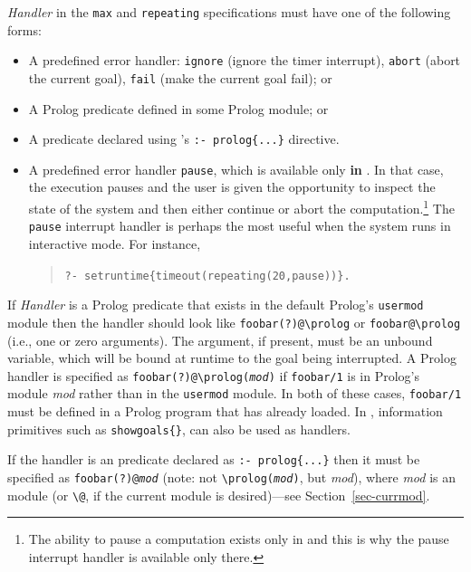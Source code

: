 \documentclass[11pt]{article}
\newcommand{\ERGO}{\mbox{\smaller{\ensuremath{\cal{E}}\smaller{{\sc{RGO}}}}}\xspace}
\newcommand{\FLSYSTEM}{\ERGO}
\newcommand{\bs}{\textbackslash}
\begin{document}
\noindent
{}
\emph{Handler} in the \texttt{max} and \texttt{repeating}
specifications must have one of the following forms:
  \begin{itemize}
  \item A predefined error handler: \texttt{ignore} (ignore the timer
    interrupt), \texttt{abort} (abort the current goal), \texttt{fail}
    (make the current goal fail); or
  \item A Prolog predicate defined in some Prolog module; or
  \item A predicate declared using \FLSYSTEM's \texttt{:- prolog\{...\}} directive.
  \item A predefined error handler \texttt{pause}, which is available only
    \textbf{in} \ERGO. In that case, the execution pauses and the user is
    given the
    opportunity to inspect the state of the system and then either continue
    or abort the computation.\footnote{The ability to pause a computation exists
    only in \ERGO and this is why the pause interrupt handler is available
    only there.}
  The \texttt{pause} interrupt handler is perhaps the most useful when the
  system runs in interactive mode. 
  For instance,
  \begin{quote}
    \texttt{?- setruntime\{timeout(repeating(20,pause))\}.}     
  \end{quote}
  \end{itemize}

  If \emph{Handler} is a Prolog predicate that exists in the default
  Prolog's \texttt{usermod} module then the handler should look like
  \texttt{foobar(?)@\bs{}prolog} or \texttt{foobar@\bs{}prolog} (i.e., one or zero arguments).
  The argument, if present, must be an unbound variable, which will
  be bound at runtime to the goal being interrupted.
  A Prolog handler is specified as 
  \texttt{foobar(?)@\bs{}prolog(\emph{mod})} if 
  \texttt{foobar/1} is in Prolog's module \emph{mod} rather than in
  the \texttt{usermod} module. In both of these cases, \texttt{foobar/1} 
  must be defined in a Prolog program that \FLSYSTEM has already loaded.
  In \ERGO, information primitives such as \texttt{showgoals\{\}}, can also
  be used as handlers. 

  If the handler is an \FLSYSTEM predicate declared
  as \texttt{:- prolog\{...\}} then it must be specified as
  \texttt{foobar(?)@\emph{mod}} (note: not \texttt{\bs{}prolog(\emph{mod})}, but
  \emph{mod}), where \emph{mod} is an \FLSYSTEM module (or
  \texttt{\bs{}@}, if the current \FLSYSTEM module is desired)---see
  Section~\ref{sec-currmod}.
\end{document}
